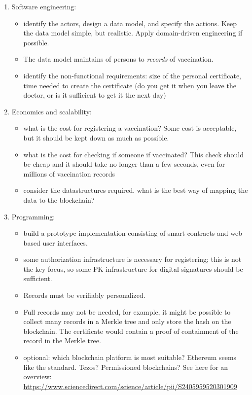 \documentclass{article}
\begin{document}
\begin{enumerate}
\item Software engineering:
  \begin{itemize}
  \item identify the actors, design a data model, and specify the
    actions. Keep the data model simple, but realistic. Apply
    domain-driven engineering if possible.
  \item The data model maintains of persons to \emph{records} of vaccination.
  \item identify the non-functional requirements: size of the personal
    certificate, time needed to create the certificate (do you get it
    when you leave the doctor, or is it sufficient to get it the next day)
  \end{itemize}

\item Economics and scalability:
  \begin{itemize}
  \item what is the cost for registering a vaccination? Some cost is
    acceptable, but it should be kept down as much as possible.
  \item what is the cost for checking if someone if vaccinated? This
    check should be cheap and it should take no longer than a few
    seconds, even for millions of vaccination records
  \item consider the datastructures required. what is the best way of
    mapping the data to the blockchain?
  \end{itemize}
\item Programming:
  \begin{itemize}
  \item build a prototype implementation consisting of smart contracts
    and web-based user interfaces.
  \item some authorization infrastructure is necessary for
    registering; this is not the key focus, so some PK infrastructure
    for digital signatures should be sufficient.
  \item Records must be verifiably personalized.
  \item  Full records may not be needed, for example, it might be
    possible to collect many records in a Merkle tree and only store
    the hash on the blockchain. The certificate would contain a proof
    of containment of the record in the Merkle tree.
  \item optional: which blockchain platform is most suitable? Ethereum
    seems like the standard. Tezos? Permissioned blockchains? See here
    for an overview: \url{https://www.sciencedirect.com/science/article/pii/S2405959520301909}
  \end{itemize}
\end{enumerate}
\end{document}
